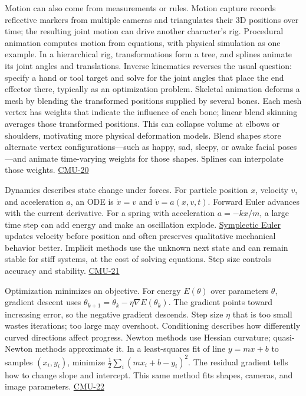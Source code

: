 Motion can also come from measurements or rules. Motion capture records reflective markers from multiple cameras and triangulates their 3D positions over time; the resulting joint motion can drive another character's rig. Procedural animation computes motion from equations, with physical simulation as one example. In a hierarchical rig, transformations form a tree, and splines animate its joint angles and translations. Inverse kinematics reverses the usual question: specify a hand or tool target and solve for the joint angles that place the end effector there, typically as an optimization problem. Skeletal animation deforms a mesh by blending the transformed positions supplied by several bones. Each mesh vertex has weights that indicate the influence of each bone; linear blend skinning averages those transformed positions. This can collapse volume at elbows or shoulders, motivating more physical deformation models. Blend shapes store alternate vertex configurations---such as happy, sad, sleepy, or awake facial poses---and animate time-varying weights for those shapes. Splines can interpolate those weights. \hyperref[04-visual-computing-ii-ch036]{CMU-20}

Dynamics describes state change under forces. For particle position \(x\), velocity \(v\), and acceleration \(a\), an ODE is \(\dot x=v\) and \(\dot v=a(x,v,t)\). Forward Euler advances with the current derivative. For a spring with acceleration \(a=-kx/m\), a large time step can add energy and make an oscillation explode. \hyperref[appendix-18eacf61a04b]{Symplectic Euler} updates velocity before position and often preserves qualitative mechanical behavior better. Implicit methods use the unknown next state and can remain stable for stiff systems, at the cost of solving equations. Step size controls accuracy and stability. \hyperref[04-visual-computing-ii-ch036]{CMU-21}

Optimization minimizes an objective. For energy \(E(\theta)\) over parameters \(\theta\), gradient descent uses \(\theta_{k+1}=\theta_k-\eta\nabla E(\theta_k)\). The gradient points toward increasing error, so the negative gradient descends. Step size \(\eta\) that is too small wastes iterations; too large may overshoot. Conditioning describes how differently curved directions affect progress. Newton methods use Hessian curvature; quasi-Newton methods approximate it. In a least-squares fit of line \(y=mx+b\) to samples \((x_i,y_i)\), minimize \(\tfrac12\sum_i(mx_i+b-y_i)^2\). The residual gradient tells how to change slope and intercept. This same method fits shapes, cameras, and image parameters. \hyperref[04-visual-computing-ii-ch036]{CMU-22}

